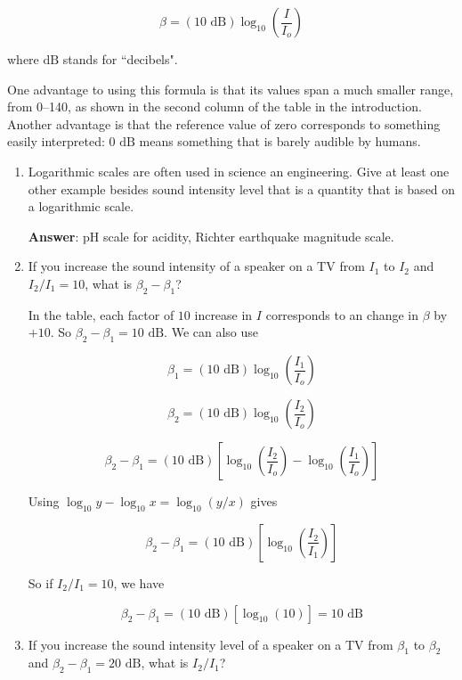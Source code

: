 \documentclass{article}
\begin{document}
$$\beta = (10 \text{ dB})\log_{10}\left(\frac{I}{I_o}\right)$$

where $\text{dB}$ stands for ``decibels".

One advantage to using this formula is that its values span a much smaller range, from 0--140, as shown in the second column of the table in the introduction. Another advantage is that the reference value of zero corresponds to something easily interpreted: $0\text{ dB}$ means something that is barely audible by humans.

\begin{enumerate}

  \item Logarithmic scales are often used in science an engineering. Give at least one other example besides sound intensity level that is a quantity that is based on a logarithmic scale.

        \ifsolutions
        \textbf{Answer}: pH scale for acidity, Richter earthquake magnitude scale.
        \else
        \vskip 96pt
        \fi

  \item If you increase the sound intensity of a speaker on a TV from $I_1$ to $I_2$ and $I_2/I_1=10$, what is $\beta_2-\beta_1$?

        \ifsolutions
        In the table, each factor of $10$ increase in $I$ corresponds to an change in $\beta$ by $+10$. So $\beta_2-\beta_1 = 10\text{ dB}$. We can also use

        $$\beta_1 = (10 \text{ dB})\log_{10}\left(\frac{I_1}{I_o}\right)$$

        $$\beta_2 = (10 \text{ dB})\log_{10}\left(\frac{I_2}{I_o}\right)$$

        $$\beta_2-\beta_1 = (10 \text{ dB})\left[\log_{10}\left(\frac{I_2}{I_o}\right)-\log_{10}\left(\frac{I_1}{I_o}\right)\right]$$

        Using $\log_{10}y - \log_{10}x = \log_{10}(y/x)$ gives

        $$\beta_2-\beta_1 = (10 \text{ dB})\left[\log_{10}\left(\frac{I_2}{I_1}\right)\right]$$

        So if $I_2/I_1 = 10$, we have

        $$\beta_2-\beta_1 = (10 \text{ dB})\left[\log_{10}(10)\right]= 10 \text{ dB}$$
        \else
        \vskip 96pt
        \fi

  \item If you increase the sound intensity level of a speaker on a TV from $\beta_1$ to $\beta_2$ and $\beta_2-\beta_1=20\text{ dB}$, what is $I_2/I_1$?


\end{enumerate}
\end{document}
